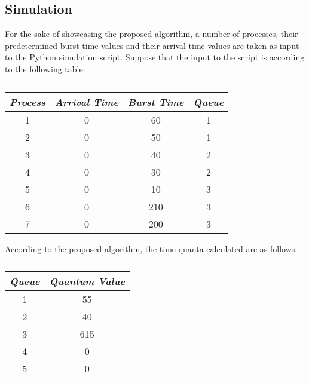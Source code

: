 \documentclass[conference]{IEEEtran}
\newcommand\T{\rule{0pt}{2.6ex}}       %
\newcommand\B{\rule[-1.2ex]{0pt}{0pt}} %
\begin{document}

\subsection{Simulation}

For the sake of showcasing the proposed algorithm, a number of processes, their predetermined burst time values and their arrival time values are taken as input to the Python simulation script. Suppose that the input to the script is according to the following table:

\begin{table}[H]
    \caption{}
    \centering
     \begin{tabular}{||c c c c||} 
     \hline
     \textit{\textbf{Process}} & \textit{\textbf{Arrival Time}} & \textit{\textbf{Burst Time}} & \textit{\textbf{Queue}} \T \B \\ 
     \hline
     \hline
     1 & 0 & 60 & 1 \T \B \\ 
     \hline
     2 & 0 & 50 & 1 \T \B \\
     \hline
     3 & 0 & 40 & 2 \T \B \\
     \hline
     4 & 0 & 30 & 2 \T \B \\
     \hline
     5 & 0 & 10 & 3 \T \B \\ 
     \hline
     6 & 0 & 210 & 3 \T \B \\ 
     \hline
     7 & 0 & 200 & 3 \T \B \\ 
     \hline
     \end{tabular}
     \label{table1}
\end{table}

According to the proposed algorithm, the time quanta calculated are as follows:

\begin{table}[H]
    \caption{}
    \centering
     \begin{tabular}{||c c||} 
     \hline
     \textit{\textbf{Queue}} & \textit{\textbf{Quantum Value}} \T \B \\ 
     \hline
     \hline
     1 & 55 \T \B \\ 
     \hline
     2 & 40 \T \B \\
     \hline
     3 & 615 \T \B \\
     \hline
     4 & 0 \T \B \\
     \hline
     5 & 0 \T \B \\ 
     \hline
     \end{tabular}
\end{table}
\end{document}
